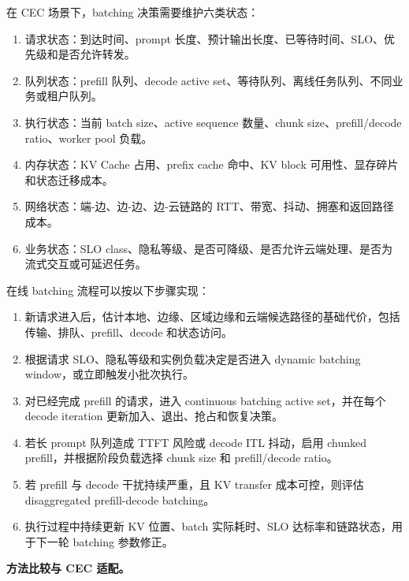 \documentclass[a4paper,10pt]{ctexart}
\begin{document}
在 CEC 场景下，batching 决策需要维护六类状态：


\begin{enumerate}
\item 请求状态：到达时间、prompt 长度、预计输出长度、已等待时间、SLO、优先级和是否允许转发。

\item 队列状态：prefill 队列、decode active set、等待队列、离线任务队列、不同业务或租户队列。

\item 执行状态：当前 batch size、active sequence 数量、chunk size、prefill/decode ratio、worker pool 负载。

\item 内存状态：KV Cache 占用、prefix cache 命中、KV block 可用性、显存碎片和状态迁移成本。

\item 网络状态：端-边、边-边、边-云链路的 RTT、带宽、抖动、拥塞和返回路径成本。

\item 业务状态：SLO class、隐私等级、是否可降级、是否允许云端处理、是否为流式交互或可延迟任务。

\end{enumerate}
在线 batching 流程可以按以下步骤实现：


\begin{enumerate}
\item 新请求进入后，估计本地、边缘、区域边缘和云端候选路径的基础代价，包括传输、排队、prefill、decode 和状态访问。

\item 根据请求 SLO、隐私等级和实例负载决定是否进入 dynamic batching window，或立即触发小批次执行。

\item 对已经完成 prefill 的请求，进入 continuous batching active set，并在每个 decode iteration 更新加入、退出、抢占和恢复决策。

\item 若长 prompt 队列造成 TTFT 风险或 decode ITL 抖动，启用 chunked prefill，并根据阶段负载选择 chunk size 和 prefill/decode ratio。

\item 若 prefill 与 decode 干扰持续严重，且 KV transfer 成本可控，则评估 disaggregated prefill-decode batching。

\item 执行过程中持续更新 KV 位置、batch 实际耗时、SLO 达标率和链路状态，用于下一轮 batching 参数修正。

\end{enumerate}
\textbf{方法比较与 CEC 适配。}
\end{document}
